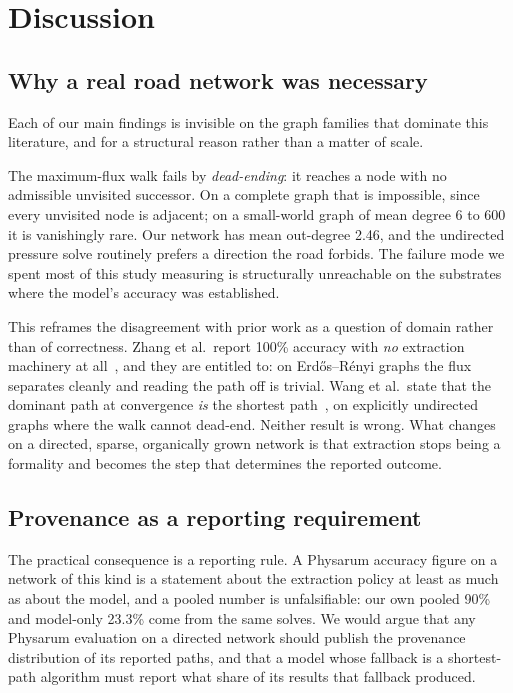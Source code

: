 \section{Discussion}

\subsection{Why a real road network was necessary}

Each of our main findings is invisible on the graph families that dominate
this literature, and for a structural reason rather than a matter of scale.

The maximum-flux walk fails by \emph{dead-ending}: it reaches a node with no
admissible unvisited successor. On a complete graph that is impossible, since
every unvisited node is adjacent; on a small-world graph of mean degree 6 to
600 it is vanishingly rare. Our network has mean out-degree 2.46, and the
undirected pressure solve routinely prefers a direction the road forbids. The
failure mode we spent most of this study measuring is structurally
unreachable on the substrates where the model's accuracy was established.

This reframes the disagreement with prior work as a question of domain rather
than of correctness. Zhang et al.\ report 100\% accuracy with \emph{no}
extraction machinery at all~\cite{zhang2014improved}, and they are entitled
to: on Erd\H{o}s--R\'enyi graphs the flux separates cleanly and reading the
path off is trivial. Wang et al.\ state that the dominant path at
convergence \emph{is} the shortest path~\cite{wang2021transition}, on
explicitly undirected graphs where the walk cannot dead-end. Neither result
is wrong. What changes on a directed, sparse, organically grown network is
that extraction stops being a formality and becomes the step that determines
the reported outcome.

\subsection{Provenance as a reporting requirement}

The practical consequence is a reporting rule. A Physarum accuracy figure on
a network of this kind is a statement about the extraction policy at least as
much as about the model, and a pooled number is unfalsifiable: our own
pooled 90\% and model-only 23.3\% come from the same solves. We would argue
that any Physarum evaluation on a directed network should publish the
provenance distribution of its reported paths, and that a model whose
fallback is a shortest-path algorithm must report what share of its results
that fallback produced.

